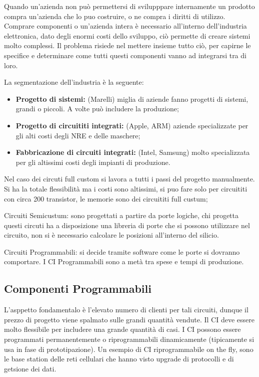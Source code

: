 \documentclass[12pt]{article}
\begin{document}
Quando un'azienda non pu\`o permettersi di svilupppare internamente un prodotto compra un'azienda che lo puo costruire, o ne compra i diritti di utilizzo. Comprare componenti o un'azienda intera \`e necessario all'interno dell'industria elettronica, dato degli enormi costi dello sviluppo, ci\`o permette di creare sistemi molto complessi. Il problema risiede nel mettere insieme tutto ci\`o, per capirne le specifice e determinare come tutti questi componenti vanno ad integrarsi tra di loro.

La segmentazione dell'industria \`e la seguente:
\begin{itemize}
    \item \textbf{Progetto di sistemi:} (Marelli) miglia di aziende fanno progetti di sistemi, grandi o piccoli. A volte pu\`o includere la produzione;
    \item \textbf{Progetto di circuititi integrati:} (Apple, ARM) aziende specializzate per gli alti costi degli NRE e delle maschere;
    \item \textbf{Fabbricazione di circuiti integrati:} (Intel, Samsung) molto specializzata per gli altissimi costi degli impianti di produzione.
\end{itemize}

Nel caso dei circuti full custom si lavora a tutti i passi del progetto manualmente. Si ha la totale flessibilit\`a ma i costi sono altissimi, si puo fare solo per circuititi con circa 200 transistor, le memorie sono dei circuititi full custum;

Circuiti Semicustum: sono progettati a partire da porte logiche, chi progetta questi circuti ha a disposizione una libreria di porte che si possono utilizzare nel circuito, non si \`e necessario calcolare le posizioni all'interno del silicio.

Circuiti Programmabili: si decide tramite software come le porte si dovranno comportare. I CI Programmabili sono a met\`a tra spese e tempi di produzione. 

\subsection{Componenti Programmabili}
L'asppetto fondamentalo \`e l'elevato numero di clienti per tali circuiti, dunque il prezzo di progetto viene spalmato sulle grandi quantit\`a vendute. Il CI deve essere molto flessibile per includere una grande quantit\`a di casi. I CI possono essere programmati permanentemente o riprogrammabili dinamicamente (tipicamente si usa in fase di prototipazione). Un esempio di CI riprogrammabile on the fly, sono le base station delle reti cellulari che hanno visto upgrade di protocolli e di getsione dei dati.
\end{document}
